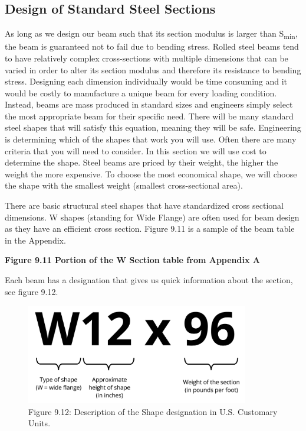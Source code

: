 \documentclass[
  letterpaper,
  DIV=11,
  numbers=noendperiod]{scrreprt}
\begin{document}
\subsection{Design of Standard Steel
Sections}\label{design-of-standard-steel-sections}

As long as we design our beam such that its section modulus is larger
than S\textsubscript{min}, the beam is guaranteed not to fail due to
bending stress. Rolled steel beams tend to have relatively complex
cross-sections with multiple dimensions that can be varied in order to
alter its section modulus and therefore its resistance to bending
stress. Designing each dimension individually would be time consuming
and it would be costly to manufacture a unique beam for every loading
condition. Instead, beams are mass produced in standard sizes and
engineers simply select the most appropriate beam for their specific
need. There will be many standard steel shapes that will satisfy this
equation, meaning they will be safe. Engineering is determining which of
the shapes that work you will use. Often there are many criteria that
you will need to consider. In this section we will use cost to determine
the shape. Steel beams are priced by their weight, the higher the weight
the more expensive. To choose the most economical shape, we will choose
the shape with the smallest weight (smallest cross-sectional area).

There are basic structural steel shapes that have standardized cross
sectional dimensions. W shapes (standing for Wide Flange) are often used
for beam design as they have an efficient cross section. Figure 9.11 is
a sample of the beam table in the Appendix.

\textbf{Figure 9.11 Portion of the W Section table from Appendix A}

Each beam has a designation that gives us quick information about the
section, see figure 9.12.

\begin{figure}[H]

{\centering \includegraphics[width=3.83333in,height=\textheight]{images/CH9 PNGs/Figure 9.12.png}

}

\caption{Figure 9.12: Description of the Shape designation in U.S.
Customary Units.}

\end{figure}%
\end{document}
